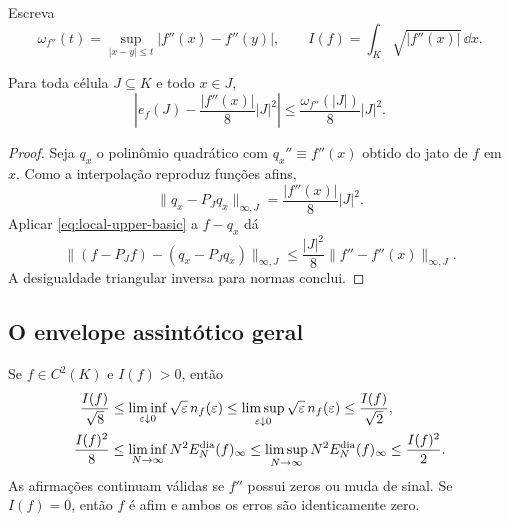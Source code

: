 Escreva
\[
 \omega_{f''}(t)=\sup_{|x-y|\le t}|f''(x)-f''(y)|,
 \qquad
 I(f)=\int_K\sqrt{|f''(x)|}\,\dd x.
\]

\begin{lemma}
\label{lem:local-asymptotic-error}
Para toda célula $J\subseteq K$ e todo $x\in J$,
\begin{equation}
 \left|e_f(J)-\frac{|f''(x)|}{8}|J|^2\right|
 \le \frac{\omega_{f''}(|J|)}{8}|J|^2.
 \label{eq:local-asymptotic-error}
\end{equation}
\end{lemma}

\begin{proof}
Seja $q_x$ o polinômio quadrático com $q_x''\equiv f''(x)$ obtido do jato de
$f$ em $x$. Como a interpolação reproduz funções afins,
\[
 \|q_x-P_Jq_x\|_{\infty,J}=\frac{|f''(x)|}{8}|J|^2.
\]
Aplicar \eqref{eq:local-upper-basic} a $f-q_x$ dá
\[
 \|(f-P_Jf)-(q_x-P_Jq_x)\|_{\infty,J}
 \le\frac{|J|^2}{8}\|f''-f''(x)\|_{\infty,J}.
\]
A desigualdade triangular inversa para normas conclui.
\end{proof}

\subsection{O envelope assintótico geral}

\begin{theorem}
\label{thm:general-dyadic-envelope}
Se $f\in C^2(K)$ e $I(f)>0$, então
\begin{align}
 \frac{I(f)}{\sqrt8}
 &\le \liminf_{\varepsilon\downarrow0}
       \sqrt\varepsilon\,n_f(\varepsilon)
 \le \limsup_{\varepsilon\downarrow0}
       \sqrt\varepsilon\,n_f(\varepsilon)
 \le \frac{I(f)}{\sqrt2},
 \label{eq:threshold-envelope}\\
 \frac{I(f)^2}{8}
 &\le \liminf_{N\to\infty}N^2E_N^{\rm dia}(f)_\infty
 \le \limsup_{N\to\infty}N^2E_N^{\rm dia}(f)_\infty
 \le \frac{I(f)^2}{2}.
 \label{eq:budget-envelope}
\end{align}
As afirmações continuam válidas se $f''$ possui zeros ou muda de sinal. Se
$I(f)=0$, então $f$ é afim e ambos os erros são identicamente zero.
\end{theorem}

